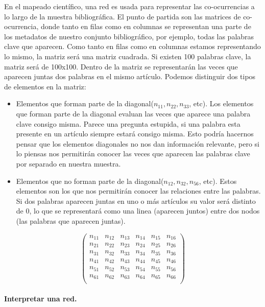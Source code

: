 \documentclass[
]{article}
\begin{document}
En el mapeado científico, una red es usada para representar las
co-ocurrencias a lo largo de la muestra bibliográfica. El punto de
partida son las matrices de co-ocurrencia, donde tanto en filas como en
columnas se representan una parte de los metadatos de nuestro conjunto
bibliográfico, por ejemplo, todas las palabras clave que aparecen. Como
tanto en filas como en columnas estamos representando lo mismo, la
matriz será una matriz cuadrada. Si existen 100 palabras clave, la
matriz será de 100x100. Dentro de la matriz se representarán las veces
que aparecen juntas dos palabras en el mismo artículo. Podemos
distinguir dos tipos de elementos en la matriz:

\begin{itemize}
\item
  Elementos que forman parte de la diagonal(\(n_{11}, n_{22}, n_{33}\),
  etc). Los elementos que forman parte de la diagonal evaluan las veces
  que aparece una palabra clave consigo misma. Parece una pregunta
  estupida, si una palabra esta presente en un artículo siempre estará
  consigo misma. Esto podría hacernos pensar que los elementos
  diagonales no nos dan información relevante, pero si lo piensas nos
  permitirán conocer las veces que aparecen las palabras clave por
  separado en nuestra muestra.
\item
  Elementos que no forman parte de la
  diagonal(\(n_{12}, n_{32}, n_{56}\), etc). Estos elementos son los que
  nos permitirán conocer las relaciones entre las palabras. Si dos
  palabras aparecen juntas en uno o más artículos su valor será distinto
  de 0, lo que se representará como una linea (aparecen juntos) entre
  dos nodos (las palabras que aparecen juntas).
\end{itemize}

\[
\left(
\begin{array}{llll}
n_{11}&n_{12} & n_{13}&n_{14}&n_{15} & n_{16} \\
n_{21}&n_{22} & n_{23}&n_{24}&n_{25} & n_{26} \\
n_{31}&n_{32} & n_{33}&n_{34}&n_{35} & n_{36} \\
n_{41}&n_{42} & n_{43}&n_{44}&n_{45} & n_{46} \\
n_{51}&n_{52} & n_{53}&n_{54}&n_{55} & n_{56} \\
n_{61}&n_{62} & n_{63}&n_{64}&n_{65} & n_{66} \\
\end{array}
\right)
\]

\hypertarget{interpretar-una-red.}{%
\paragraph{Interpretar una red.}\label{interpretar-una-red.}}
\end{document}
